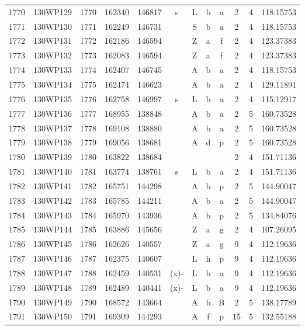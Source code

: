 \begin{tabular}{|*{12}{c|}}
1770 & 130WP129 & 1770 & 162340 & 146817 & s & L & b & a & 2 & 4 & 118.15753 \\ 
1771 & 130WP130 & 1771 & 162249 & 146731 &  & S & b & a & 2 & 4 & 118.15753 \\ 
1772 & 130WP131 & 1772 & 162186 & 146594 &  & Z & a & f & 2 & 4 & 123.37383 \\ 
1773 & 130WP132 & 1773 & 162083 & 146594 &  & Z & a & f & 2 & 4 & 123.37383 \\ 
1774 & 130WP133 & 1774 & 162407 & 146745 &  & A & b & a & 2 & 4 & 118.15753 \\ 
1775 & 130WP134 & 1775 & 162474 & 146623 &  & A & b & a & 2 & 4 & 129.11891 \\ 
1776 & 130WP135 & 1776 & 162758 & 146997 & s & L & b & a & 2 & 4 & 115.12917 \\ 
1777 & 130WP136 & 1777 & 168955 & 138848 &  & A & b & a & 2 & 5 & 160.73528 \\ 
1778 & 130WP137 & 1778 & 169108 & 138880 &  & A & b & a & 2 & 5 & 160.73528 \\ 
1779 & 130WP138 & 1779 & 169056 & 138681 &  & A & d & p & 2 & 5 & 160.73528 \\ 
1780 & 130WP139 & 1780 & 163822 & 138684 &  &  &  &  & 2 & 4 & 151.71136 \\ 
1781 & 130WP140 & 1781 & 163774 & 138761 & s & L & b & a & 2 & 4 & 151.71136 \\ 
1782 & 130WP141 & 1782 & 165751 & 144298 &  & A & b & p & 2 & 5 & 144.90047 \\ 
1783 & 130WP142 & 1783 & 165785 & 144211 &  & A & b & a & 2 & 5 & 144.90047 \\ 
1784 & 130WP143 & 1784 & 165970 & 143936 &  & A & b & p & 2 & 5 & 134.84076 \\ 
1785 & 130WP144 & 1785 & 163886 & 145656 &  & Z & a & g & 2 & 4 & 107.26095 \\ 
1786 & 130WP145 & 1786 & 162626 & 140557 &  & Z & a & g & 9 & 4 & 112.19636 \\ 
1787 & 130WP146 & 1787 & 162375 & 140607 &  & L & h & p & 9 & 4 & 112.19636 \\ 
1788 & 130WP147 & 1788 & 162459 & 140531 & (x)- & L & b & a & 9 & 4 & 112.19636 \\ 
1789 & 130WP148 & 1789 & 162489 & 140441 & (x)- & L & b & a & 9 & 4 & 112.19636 \\ 
1790 & 130WP149 & 1790 & 168572 & 143664 &  & A & b & B & 2 & 5 & 138.17789 \\ 
1791 & 130WP150 & 1791 & 169309 & 144293 &  & A & f & p & 15 & 5 & 132.55188 \\ 

\end{tabular}
